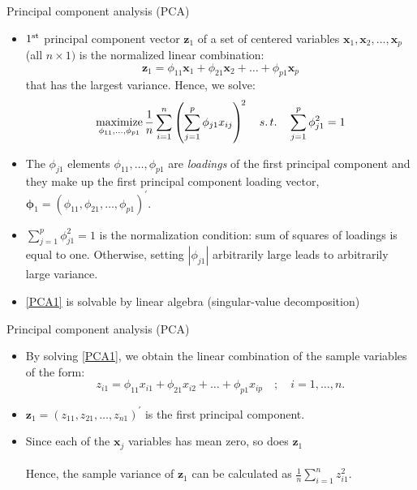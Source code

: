 \documentclass{beamer}
\begin{document}
\begin{frame}{Principal component analysis (PCA)}
\begin{itemize}
\item $1^{\textnormal{st}}$ principal component vector $\bm{z}_1$ of a set of centered variables
$\bm{x}_1, \bm{x}_2, \dots, \bm{x}_p$ (all $n\!\times\!1)$ is the normalized linear combination:
\vspace{-0.1cm}
$$ \bm{z}_1 = \phi_{11}\bm{x}_1 + \phi_{21}\bm{x}_2 + \dots + \phi_{p1}\bm{x}_p$$
\vspace{-0.1cm}
that has the largest variance. Hence, we solve:
\begin{equation} \label{PCA1}
\underset{\phi_{11},\dots,\phi_{p1}}{\textnormal{maximize}} \, 
  \frac{1}{n} \sum_{i=1}^n \left( \sum_{j=1}^p  
  \phi_{j1}x_{ij} \right)^{\!2} \,\,\,\,\,\, s.\,t. \,\,\,\,\,\,     
  \sum_{j=1}^p \phi_{j1}^2=1 
\end{equation}
\item The $\phi_{j1}$ elements $\phi_{11}, \dots, \phi_{p1}$ are \textit{loadings} of the first principal component and they make up the first principal component loading vector, $\bm{\phi}_1 = (\phi_{11}, \phi_{21},\dots, \phi_{p1})^\prime$.
\item $\sum_{j=1}^p \phi_{j1}^2 =1$ is the normalization condition: sum of squares of loadings is equal to one. Otherwise, setting $|\phi_{j1}|$ arbitrarily large leads to arbitrarily large variance.
\item \eqref{PCA1} is solvable by linear algebra (singular-value decomposition)
\end{itemize}
\end{frame}
\begin{frame}{Principal component analysis (PCA)}
\begin{itemize}
\item By solving \eqref{PCA1}, we obtain the linear combination of the sample variables of the form:
$$z_{i1}= \phi_{11}x_{i1} + \phi_{21}x_{i2} + \dots + \phi_{p1}x_{ip} \,\,\,\,\,\,;\,\,\,\,\,\,            i=1,\dots,n.$$
\item $\bm{z}_1 = (z_{11}, z_{21}, \dots, z_{n1})^{\prime}$ is the first principal component. 
\medskip
\item Since each of the $\bm{x}_j$ variables has mean zero, so does $\bm{z}_1$\\~\\
Hence, the sample variance of $\bm{z}_1$ can be calculated as $\frac{1}{n} \sum_{i=1}^n z_{i1}^2$.
\end{itemize}
\end{frame}
\end{document}

